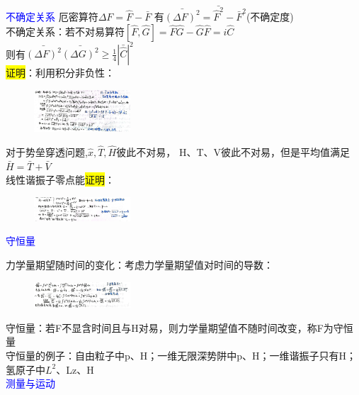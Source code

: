 \documentclass[a4paper,8pt]{extarticle} %
\newcommand{\bluetext}[1]{\textcolor{blue}{#1}}
\newcommand{\yellowback}[1]{\colorbox{yellow}{#1}}
\begin{document}
\begin{multicols}{3}
\bluetext{不确定关系}
厄密算符$\Delta F = \hat{F}-\bar{F}$
有$\bar{(\Delta F)^2} = \bar{\hat{F}^2} - \bar{F}^2$(不确定度)\\
不确定关系：若不对易算符$[\hat{F},\hat{G}] = \hat{F}\hat{G}-\hat{G}\hat{F} = i\hat{C}$\\
则有$\bar{(\Delta F)^2}\bar{(\Delta G)^2} \geq \frac{1}{4}|\bar{\hat{C}}|^2$\\
\yellowback{证明}：利用积分非负性：
\begin{figure}[H]
    \vspace{-0.5cm}
    \centering
    \includegraphics[width=0.32\textwidth]{images/28.png}
    \vspace{-0.6cm}
\end{figure}
对于势垒穿透问题,$\hat{x},\hat{T},\hat{H}$彼此不对易，
H、T、V彼此不对易，但是平均值满足$\bar{H} = \bar{T} + \bar{V}$\\
线性谐振子零点能\yellowback{证明}：
\begin{figure}[H]
    \centering
    \includegraphics[width=0.32\textwidth]{images/3.png}
    \vspace{-0.6cm}
\end{figure}
\bluetext{守恒量}

力学量期望随时间的变化：考虑力学量期望值对时间的导数：\\
\begin{figure}[H]
    \vspace{-0.5cm}
    \centering
    \includegraphics[width=0.32\textwidth]{images/29.png}
    \vspace{-0.6cm}
\end{figure}
守恒量：若F不显含时间且与H对易，则力学量期望值不随时间改变，称F为守恒量\\
守恒量的例子：自由粒子中p、H；一维无限深势阱中p、H；一维谐振子只有H；氢原子中$L^2$、Lz、H\\
\bluetext{测量与运动}


\end{multicols}
\end{document}
